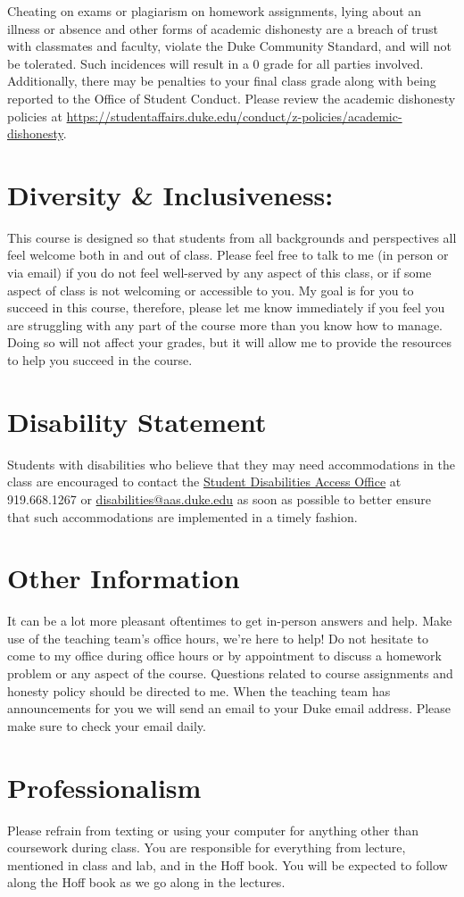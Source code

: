 \documentclass[11pt, a4paper]{article}
\begin{document}
Cheating on exams or plagiarism on homework assignments, lying about an illness or absence and other forms of academic dishonesty are a breach of trust with classmates and faculty, violate the Duke Community Standard, and will not be tolerated. Such incidences will result in a 0 grade for all parties involved. Additionally, there may be penalties to your final class grade along with being reported to the Office of Student Conduct. Please review the academic dishonesty policies at \url{https://studentaffairs.duke.edu/conduct/z-policies/academic-dishonesty}.


\section{Diversity \& Inclusiveness:}
This course is designed so that students from all backgrounds and perspectives all feel welcome both in and out of class. Please feel free to talk to me (in person or via email) if you do not feel well-served by any aspect of this class, or if some aspect of class is not welcoming or accessible to you. My goal is for you to succeed in this course, therefore, please let me know immediately if you feel you are struggling with any part of the course more than you know how to manage. Doing so will not affect your grades, but it will allow me to provide the resources to help you succeed in the course.


\section{Disability Statement} 
Students with disabilities who believe that they may need accommodations in the class are encouraged to contact the \href{https://access.duke.edu/students/staff.php}{Student Disabilities Access Office} at 919.668.1267 or \href{mailto:disabilities@aas.duke.edu}{disabilities@aas.duke.edu}  as soon as possible to better ensure that such accommodations are implemented in a timely fashion.


\section{Other Information} 
It can be a lot more pleasant oftentimes to get in-person answers and help. Make use of the teaching team's office hours, we're here to help! Do not hesitate to come to my office during office hours or by appointment to discuss a homework problem or any aspect of the course.  Questions related to course assignments and honesty policy should be directed to me. When the teaching team has announcements for you we will send an email to your Duke email address. Please make sure to check your email daily.


\section{Professionalism}
Please refrain from texting or using your computer for anything other than coursework during class. You are responsible for everything from lecture, mentioned in class and lab, and in the Hoff book. You will be expected to follow along the Hoff book as we go along in the lectures.
\end{document}
